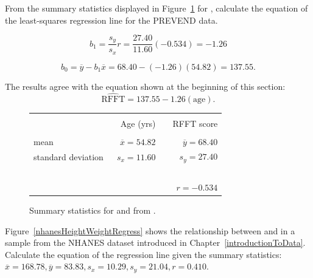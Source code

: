 \textD{\newpage}

\begin{examplewrap}
\begin{nexample}{From the summary statistics displayed in Figure~\ref{summaryAgeRFFT} for , calculate the equation of the least-squares regression line for the PREVEND data.}

\[b_1 = \frac{s_y}{s_x} r = \frac{27.40}{11.60}(-0.534) = -1.26\]

\[b_0 = \overline{y} - b_1\overline{x} = 68.40 - (-1.26)(54.82) = 137.55. \]

The results agree with the equation shown at the beginning of this section:
\[\widehat{\text{RFFT}} = 137.55 - 1.26(\text{age}).\]
\end{nexample}
\end{examplewrap}

\begin{figure}[ht]
	\centering
	\begin{tabular}{l rr}
		\hline
		\vspace{-4mm} & & \\
		\vspace{0.4mm}	&	\ \ Age (yrs)	& \ \ RFFT score \\
		\hline
		\vspace{-3.9mm} & & \\
		mean	& $\overline{x} = 54.82$		& $\overline{y} = 68.40$ \\
		standard deviation		& $s_x = 11.60$		& $s_y = 27.40$\vspace{0.4mm} \\
		\hline
		\vspace{-4mm}\ &\\
		& \multicolumn{2}{r}{$r=-0.534$} \\
		\hline
	\end{tabular}
	\caption{Summary statistics for  and  from .}
	\label{summaryAgeRFFT}
\end{figure}


\begin{exercisewrap}
\begin{nexercise}
Figure~\ref{nhanesHeightWeightRegress} shows the relationship between  and  in a sample from the NHANES dataset introduced in Chapter~\ref{introductionToData}. Calculate the equation of the regression line given the summary statistics: $\overline{x} = 168.78, \overline{y} = 83.83, s_{x} = 10.29, s_{y} = 21.04, r = 0.410$.\footnotemark{}
\end{nexercise}
\end{exercisewrap}

